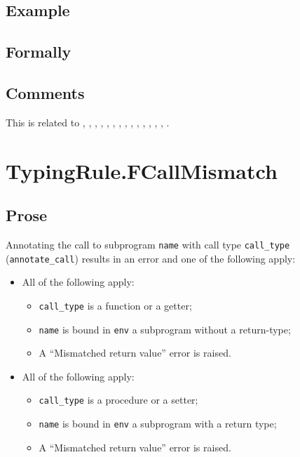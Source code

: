 \documentclass{book}
\begin{document}
\begin{itemize}
  \subsection{Example}



\begin{emptyformal}
    \subsection{Formally}
\end{emptyformal}

\subsection{Comments}
  This is related to , , ,
  , , , , ,
  , , , , ,
  , .

\section{TypingRule.FCallMismatch \label{sec:TypingRule.FCallMismatch}}

  \subsection{Prose}
  Annotating the call to subprogram \texttt{name} with call type \texttt{call\_type} \\ (\texttt{annotate\_call}) results in an error and
  one of the following apply:
  \begin{itemize}
    \item All of the following apply: \begin{itemize} \item \texttt{call\_type}
          is a function or a getter;
        \item \texttt{name} is bound in \texttt{env} a subprogram without a return-type;
        \item A ``Mismatched return value'' error is raised.
      \end{itemize}
    \item All of the following apply:
      \begin{itemize}
        \item \texttt{call\_type} is a procedure or a setter;
        \item \texttt{name} is bound in \texttt{env} a subprogram with a return type;
        \item A ``Mismatched return value'' error is raised.
      \end{itemize}
  \end{itemize}


\end{itemize}
\end{document}
